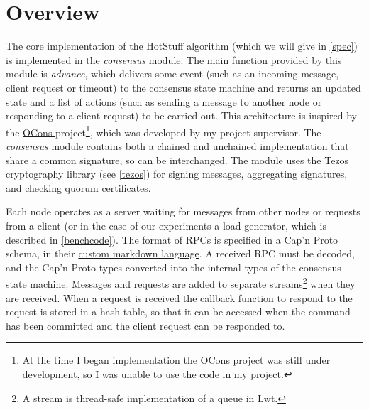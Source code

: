 
\section{Overview} \label{overview}
The core implementation of the HotStuff algorithm (which we will give in \ref{spec}) is implemented in the \textit{consensus} module. The main function provided by this module is \textit{advance}, which delivers some event (such as an incoming message, client request or timeout) to the consensus state machine and returns an updated state and a list of actions (such as sending a message to another node or responding to a client request) to be carried out. This architecture is inspired by the \href{https://github.com/Cjen1/OCons}{OCons }project\footnote{At the time I began implementation the OCons project was still under development, so I was unable to use the code in my project.}, which was developed by my project supervisor. The \textit{consensus} module contains both a chained and unchained implementation that share a common signature, so can be interchanged. The module uses the Tezos cryptography library (see \ref{tezos}) for signing messages, aggregating signatures, and checking quorum certificates.

Each node operates as a server waiting for messages from other nodes or requests from a client (or in the case of our experiments a load generator, which is described in \ref{benchcode}). The format of RPCs is specified in a Cap'n Proto schema, in their \href{https://capnproto.org/language.html}{custom markdown language}. A received RPC must be decoded, and the Cap'n Proto types converted into the internal types of the consensus state machine. Messages and requests are added to separate streams\footnote{A stream is thread-safe implementation of a queue in Lwt.} when they are received. When a request is received the callback function to respond to the request is stored in a hash table, so that it can be accessed when the command has been committed and the client request can be responded to.

